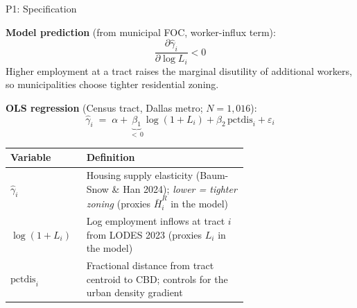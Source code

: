 \documentclass[10pt]{beamer}
\begin{document}
\begin{frame}[shrink=3]{P1: Specification}

\textbf{Model prediction} (from municipal FOC, worker-influx term):
\[
  \frac{\partial\hat\gamma_i}{\partial\log L_i} < 0
\]
Higher employment at a tract raises the marginal disutility of additional workers,
so municipalities choose tighter residential zoning.

\bigskip
\textbf{OLS regression} \quad (Census tract, Dallas metro; $N = 1{,}016$):
\[
  \hat\gamma_i
  \;=\; \alpha
  + \underbrace{\beta_1}_{<\,0}\log(1+L_i)
  + \beta_2\,\text{pctdis}_i
  + \varepsilon_i
\]

\bigskip
{\small
\renewcommand{\arraystretch}{1.3}
\begin{tabular}{@{}lp{0.68\linewidth}@{}}
\toprule
Variable & Definition \\
\midrule
$\hat\gamma_i$        & Housing supply elasticity (Baum-Snow \& Han 2024);
                        \emph{lower = tighter zoning} (proxies $\bar H_i^R$ in the model) \\[4pt]
$\log(1+L_i)$         & Log employment inflows at tract $i$ from LODES 2023
                        (proxies $L_i$ in the model) \\[4pt]
$\text{pctdis}_i$     & Fractional distance from tract centroid to CBD;
                        controls for the urban density gradient \\
\bottomrule
\end{tabular}
}

\end{frame}
\end{document}

